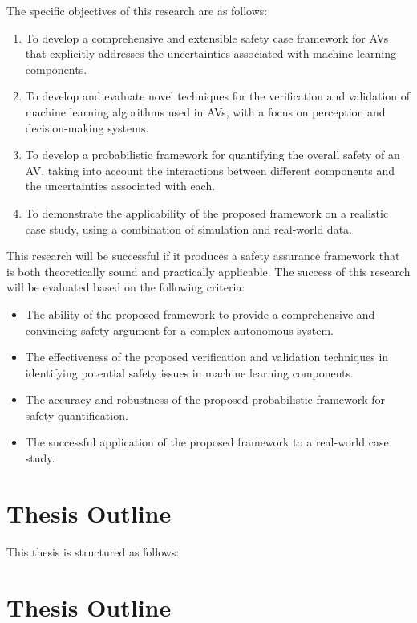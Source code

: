 The specific objectives of this research are as follows:

\begin{enumerate}
    \item To develop a comprehensive and extensible safety case framework for AVs that explicitly addresses the uncertainties associated with machine learning components.
    \item To develop and evaluate novel techniques for the verification and validation of machine learning algorithms used in AVs, with a focus on perception and decision-making systems.
    \item To develop a probabilistic framework for quantifying the overall safety of an AV, taking into account the interactions between different components and the uncertainties associated with each.
    \item To demonstrate the applicability of the proposed framework on a realistic case study, using a combination of simulation and real-world data.
\end{enumerate}

This research will be successful if it produces a safety assurance framework that is both theoretically sound and practically applicable. The success of this research will be evaluated based on the following criteria:

\begin{itemize}
    \item The ability of the proposed framework to provide a comprehensive and convincing safety argument for a complex autonomous system.
    \item The effectiveness of the proposed verification and validation techniques in identifying potential safety issues in machine learning components.
    \item The accuracy and robustness of the proposed probabilistic framework for safety quantification.
    \item The successful application of the proposed framework to a real-world case study.
\end{itemize}

\section{Thesis Outline}

This thesis is structured as follows:

\section{Thesis Outline}

